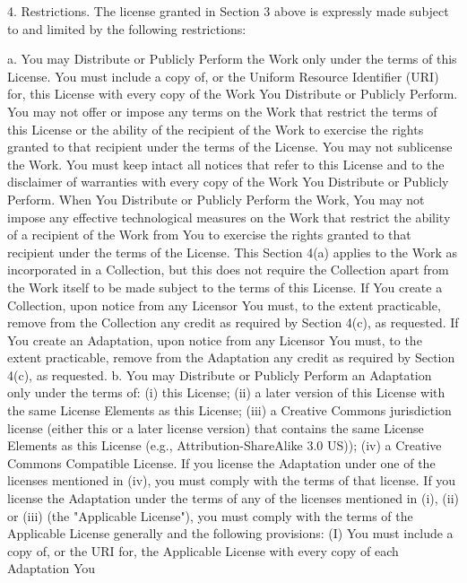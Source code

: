 4. Restrictions. The license granted in Section 3 above is expressly made
subject to and limited by the following restrictions:

 a. You may Distribute or Publicly Perform the Work only under the terms
    of this License. You must include a copy of, or the Uniform Resource
    Identifier (URI) for, this License with every copy of the Work You
    Distribute or Publicly Perform. You may not offer or impose any terms
    on the Work that restrict the terms of this License or the ability of
    the recipient of the Work to exercise the rights granted to that
    recipient under the terms of the License. You may not sublicense the
    Work. You must keep intact all notices that refer to this License and
    to the disclaimer of warranties with every copy of the Work You
    Distribute or Publicly Perform. When You Distribute or Publicly
    Perform the Work, You may not impose any effective technological
    measures on the Work that restrict the ability of a recipient of the
    Work from You to exercise the rights granted to that recipient under
    the terms of the License. This Section 4(a) applies to the Work as
    incorporated in a Collection, but this does not require the Collection
    apart from the Work itself to be made subject to the terms of this
    License. If You create a Collection, upon notice from any Licensor You
    must, to the extent practicable, remove from the Collection any credit
    as required by Section 4(c), as requested. If You create an
    Adaptation, upon notice from any Licensor You must, to the extent
    practicable, remove from the Adaptation any credit as required by
    Section 4(c), as requested.
 b. You may Distribute or Publicly Perform an Adaptation only under the
    terms of: (i) this License; (ii) a later version of this License with
    the same License Elements as this License; (iii) a Creative Commons
    jurisdiction license (either this or a later license version) that
    contains the same License Elements as this License (e.g.,
    Attribution-ShareAlike 3.0 US)); (iv) a Creative Commons Compatible
    License. If you license the Adaptation under one of the licenses
    mentioned in (iv), you must comply with the terms of that license. If
    you license the Adaptation under the terms of any of the licenses
    mentioned in (i), (ii) or (iii) (the "Applicable License"), you must
    comply with the terms of the Applicable License generally and the
    following provisions: (I) You must include a copy of, or the URI for,
    the Applicable License with every copy of each Adaptation You
